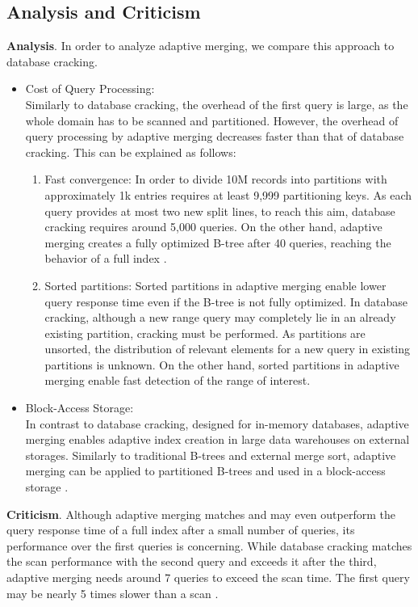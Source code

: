 \documentclass[10pt, conference, compsocconf]{IEEEtran}
\begin{document}
\subsection{Analysis and Criticism}
\label{subsec:merging_analysis}
\textbf{Analysis}. In order to analyze adaptive merging, we compare this approach to database cracking.\\
\begin{itemize}
\item{Cost of Query Processing:} \\Similarly to database cracking, the overhead of the first query is large, as the whole domain has to be scanned and partitioned. However, the overhead of query processing by adaptive merging decreases faster than that of database cracking. This can be explained as follows:\\
\begin{enumerate}
\item{Fast convergence}: In order to divide 10M records into partitions with approximately 1k entries requires at least 9,999 partitioning keys. As each query provides at most two new split lines, to reach this aim, database cracking requires around 5,000 queries. On the other hand, adaptive merging creates a fully optimized B-tree after 40 queries, reaching the behavior of a full index \cite{merging}.
\item{Sorted partitions}: Sorted partitions in adaptive merging enable lower query response time even if the B-tree is not fully optimized. In database cracking, although a new range query may completely lie in an already existing partition, cracking must be performed. As partitions are unsorted, the distribution of relevant elements for a new query in existing partitions is unknown. On the other hand, sorted partitions in adaptive merging enable fast detection of the range of interest.\\
\end{enumerate}
\item{Block-Access Storage:} \\ In contrast to database cracking, designed for in-memory databases, adaptive merging enables adaptive index creation in large data warehouses on external storages. Similarly to traditional B-trees and external merge sort, adaptive merging can be applied to partitioned B-trees and used in a block-access storage \cite{merging}. \\
\end{itemize}

\textbf{Criticism}. Although adaptive merging matches and may even outperform the query response time of a full index after a small number of queries, its performance over the first queries is concerning. While database cracking matches the scan performance with the second query and exceeds it after the third, adaptive merging needs around 7 queries to exceed the scan time. The first query may be nearly 5 times slower than a scan \cite{hybrid}.
\end{document}
